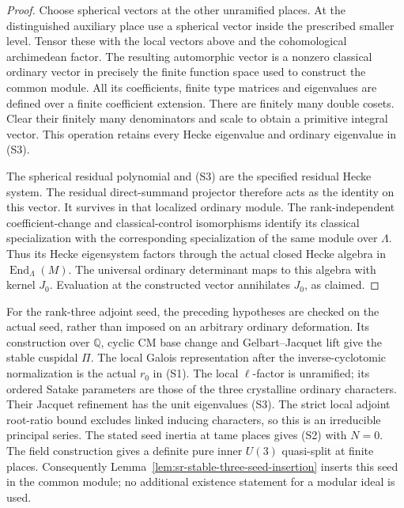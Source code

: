 \begin{proof}
Choose spherical vectors at the other unramified places.
At the distinguished auxiliary place use a spherical vector
inside the prescribed smaller level.
Tensor these with the local vectors above and the
cohomological archimedean factor.
The resulting automorphic vector is a nonzero classical
ordinary vector in precisely the finite function space used
to construct the common module.
All its coefficients, finite type matrices and eigenvalues
are defined over a finite coefficient extension.
There are finitely many double cosets.
Clear their finitely many denominators and scale to obtain
a primitive integral vector.
This operation retains every Hecke eigenvalue and
ordinary eigenvalue in (S3).

The spherical residual polynomial and (S3) are the
specified residual Hecke system.
The residual direct-summand projector therefore acts as
the identity on this vector. It survives in that
localized ordinary module.
The rank-independent coefficient-change and classical-control
isomorphisms identify its classical specialization with the
corresponding specialization of the same module over
\(\Lambda\).
Thus its Hecke eigensystem factors through the actual
closed Hecke algebra in \(\operatorname{End}_\Lambda(M)\).
The universal ordinary determinant maps to this algebra
with kernel \(J_0\). Evaluation at the constructed vector
annihilates \(J_0\), as claimed.
\end{proof}

For the rank-three adjoint seed, the preceding hypotheses are
checked on the actual seed, rather than imposed on an
arbitrary ordinary deformation.
Its construction over \(\mathbb Q\), cyclic CM base change
and Gelbart--Jacquet lift give the stable cuspidal \(\Pi\).
The local Galois representation after the inverse-cyclotomic
normalization is the actual \(r_0\) in (S1).
The local \(\ell\)-factor is unramified; its ordered Satake
parameters are those of the three crystalline ordinary
characters.
Their Jacquet refinement has the unit eigenvalues (S3).
The strict local adjoint root-ratio bound excludes linked
inducing characters, so this is an irreducible principal
series. The stated seed inertia at tame places gives (S2)
with \(N=0\).
The field construction gives a definite pure inner
\(U(3)\) quasi-split at finite places.
Consequently Lemma~\ref{lem:sr-stable-three-seed-insertion}
inserts this seed in the common module; no additional
existence statement for a modular ideal is used.



